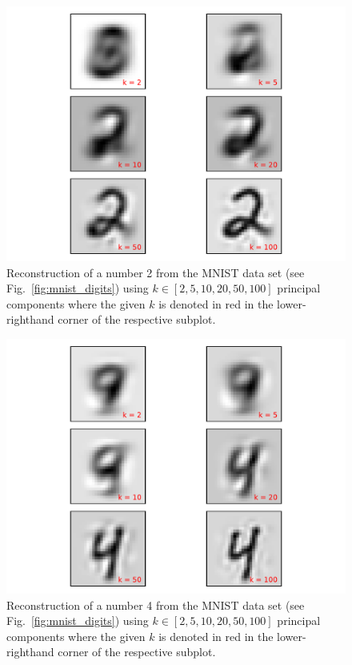 \documentclass[12pt]{amsart}
\begin{document}
\begin{figure}[H]
	\includegraphics[width=\columnwidth]{2_recon_mnist.pdf}
    \caption{Reconstruction of a number 2 from the MNIST data set (see Fig.~\ref{fig:mnist_digits}) using $k \in [2,5,10,20,50,100]$ principal components where the given $k$ is denoted in red in the lower-righthand corner of the respective subplot.}
    \label{fig:recon_2}
\end{figure}

\begin{figure}[H]
	\includegraphics[width=\columnwidth]{4_recon_mnist.pdf}
    \caption{Reconstruction of a number 4 from the MNIST data set (see Fig.~\ref{fig:mnist_digits}) using $k \in [2,5,10,20,50,100]$ principal components where the given $k$ is denoted in red in the lower-righthand corner of the respective subplot.}
    \label{fig:recon_4}
\end{figure}
\end{document}

